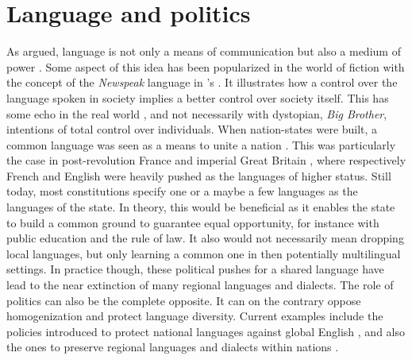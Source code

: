 \documentclass[../thesis.tex]{subfiles}
\begin{document}
\section{Language and politics}
As  argued, language is not only a
means of communication but also a medium of power \cite{BourdieuLanguageSymbolic2009}.
Some aspect of this idea has been popularized in the world of fiction with the concept
of the \emph{Newspeak} language in 's
 \cite{Orwell19841950}. It illustrates how a control over the
language spoken in society implies a better control over society itself. This has some
echo in the real world \cite{FowlerLanguageControl1979}, and not necessarily with
dystopian, \emph{Big Brother}, intentions of total control over individuals. When
nation-states were built, a common language was seen as a means to unite a nation
\cite{WrightCommunityCommunication2000}. This was particularly the case in
post-revolution France and imperial Great Britain
\cite{GrilloDominantLanguages1989,HigonnetPoliticsLinguistic1980}, where respectively
French and English were heavily pushed as the languages of higher status. Still today,
most constitutions specify one or a maybe a few languages as the languages of the state.
In theory, this would be beneficial as it enables the state to build a common ground to
guarantee equal opportunity, for instance with public education and the rule of law. It
also would not necessarily mean dropping local languages, but only learning a common one
in then potentially multilingual settings. In practice though, these political pushes
for a shared language have lead to the near extinction of many regional languages and
dialects. The role of politics can also be the complete opposite. It can on the contrary
oppose homogenization and protect language diversity. Current examples include the
policies introduced to protect national languages against global English
\cite{SonntagLocalPolitics2003}, and also the ones to preserve regional languages and
dialects within nations \cite{KaplanLanguagePlanning1997}.


\end{document}
